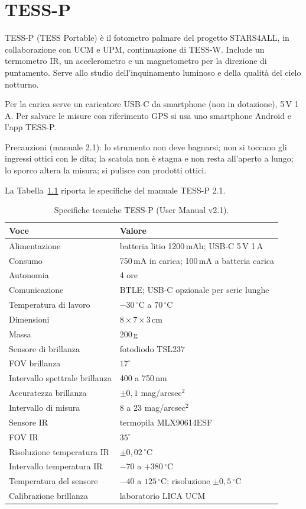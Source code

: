 \documentclass[11pt,a4paper]{report}
\begin{document}
\chapter{TESS-P}

TESS-P (TESS Portable) è il fotometro palmare del progetto STARS4ALL, in collaborazione con UCM e UPM, continuazione di TESS-W. Include un termometro IR, un accelerometro e un magnetometro per la direzione di puntamento. Serve allo studio dell'inquinamento luminoso e della qualità del cielo notturno.

Per la carica serve un caricatore USB-C da smartphone (non in dotazione), 5\,V 1\,A. Per salvare le misure con riferimento GPS si usa uno smartphone Android e l'app TESS-P.

Precauzioni (manuale 2.1): lo strumento non deve bagnarsi; non si toccano gli ingressi ottici con le dita; la scatola non è stagna e non resta all'aperto a lungo; lo sporco altera la misura; si pulisce con prodotti ottici.

La Tabella~\ref{tab:tessp} riporta le specifiche del manuale TESS-P 2.1.

\begin{table}[ht!]
\centering
\caption{Specifiche tecniche TESS-P (User Manual v2.1).}
\label{tab:tessp}

\begin{tabular}{p{}p{}}
\toprule
Voce & Valore \\
\midrule
Alimentazione & batteria litio 1200\,mAh; USB-C 5\,V 1\,A \\
Consumo & 750\,mA in carica; 100\,mA a batteria carica \\
Autonomia & 4 ore \\
Comunicazione & BTLE; USB-C opzionale per serie lunghe \\
Temperatura di lavoro & $-30\,^\circ$C a $70\,^\circ$C \\
Dimensioni & $8 \times 7 \times 3$\,cm \\
Massa & 200\,g \\
Sensore di brillanza & fotodiodo TSL237 \\
FOV brillanza & $17^\circ$ \\
Intervallo spettrale brillanza & 400 a 750\,nm \\
Accuratezza brillanza & $\pm 0{,}1$ mag/arcsec$^2$ \\
Intervallo di misura & 8 a 23 mag/arcsec$^2$ \\
Sensore IR & termopila MLX90614ESF \\
FOV IR & $35^\circ$ \\
Risoluzione temperatura IR & $\pm 0{,}02\,^\circ$C \\
Intervallo temperatura IR & $-70$ a $+380\,^\circ$C \\
Temperatura del sensore & $-40$ a $125\,^\circ$C; risoluzione $\pm 0{,}5\,^\circ$C \\
Calibrazione brillanza & laboratorio LICA UCM \\
\bottomrule
\end{tabular}
\end{table}
\end{document}
